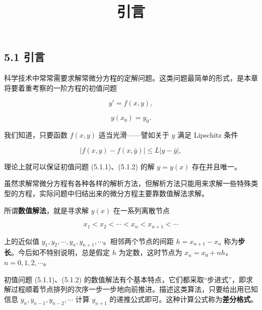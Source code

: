 \documentclass[
  10pt,
  fontset=fandol]{ctexart}
\title{引言}
\author{}
\date{}
\begin{document}
\maketitle

\subsection{5.1 引言}\label{ux5f15ux8a00}

科学技术中常常需要求解常微分方程的定解问题。这类问题最简单的形式，是本章将要着重考察的一阶方程的初值问题

\[
y'=f(x,y),\tag{5.1.1}
\]

\[
y(x_0)=y_0.\tag{5.1.2}
\]

我们知道，只要函数 \(f(x,y)\) 适当光滑------譬如关于 \(y\) 满足 Lipschitz 条件

\[
|f(x,y)-f(x,\bar y)|\leqslant L|y-\bar y|,
\]

理论上就可以保证初值问题 (5.1.1)、(5.1.2) 的解 \(y=y(x)\) 存在并且唯一。

虽然求解常微分方程有各种各样的解析方法，但解析方法只能用来求解一些特殊类型的方程，实际问题中归结出来的微分方程主要靠数值解法求解。

所谓\textbf{数值解法}，就是寻求解 \(y(x)\) 在一系列离散节点

\[
x_1<x_2<\cdots<x_n<x_{n+1}<\cdots
\]

上的近似值 \(y_1,\allowbreak y_2,\allowbreak \cdots,\allowbreak y_n,\allowbreak y_{n+1},\allowbreak \cdots\)。相邻两个节点的间距 \(h=x_{n+1}-x_n\) 称为\textbf{步长}。今后如不特别说明，总是假定 \(h\) 为定数，这时节点为 \(x_n=x_0+nh\)，\(n=0,1,2,\cdots\)。

初值问题 (5.1.1)、(5.1.2) 的数值解法有个基本特点，它们都采取``步进式''，即求解过程顺着节点排列的次序一步一步地向前推进。描述这类算法，只要给出用已知信息 \(y_n,y_{n-1},y_{n-2},\cdots\) 计算 \(y_{n+1}\) 的递推公式即可。这种计算公式称为\textbf{差分格式}。
\end{document}
